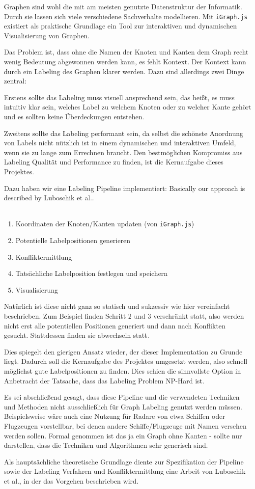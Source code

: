 Graphen sind wohl die mit am meisten genutzte Datenstruktur der Informatik.
Durch sie lassen sich viele verschiedene Sachverhalte modellieren.
Mit \texttt{iGraph.js} existiert als praktische Grundlage ein Tool zur interaktiven und dynamischen Visualisierung von Graphen.

Das Problem ist, dass ohne die Namen der Knoten und Kanten dem Graph recht wenig Bedeutung abgewonnen werden kann,
es fehlt Kontext. Der Kontext kann durch ein Labeling des Graphen klarer werden. Dazu sind allerdings zwei Dinge zentral:

Erstens sollte das Labeling muss visuell ansprechend sein, das heißt, es muss intuitiv klar sein, welches Label zu welchem Knoten oder zu welcher Kante gehört
und es sollten keine Überdeckungen entstehen.

Zweitens sollte das Labeling performant sein, da selbst die schönste Anordnung von Labels nicht nützlich ist in einem dynamischen und interaktiven Umfeld, wenn sie zu lange zum Errechnen braucht.
Den bestmöglichen Kompromiss aus Labeling Qualität und Performance zu finden, ist die Kernaufgabe dieses Projektes.

Dazu haben wir eine Labeling Pipeline implementiert:
Basically our approach is described by Luboschik et al.. \\ \\
\begin{enumerate}
    \item Koordinaten der Knoten/Kanten updaten (von \texttt{iGraph.js})
    \item Potentielle Labelpositionen generieren
    \item Konfliktermittlung
    \item Tatsächliche Labelposition festlegen und speichern
    \item Visualisierung
\end{enumerate}

Natürlich ist diese nicht ganz so statisch und sukzessiv wie hier vereinfacht beschrieben.
Zum Beispiel finden Schritt 2 und 3 verschränkt statt, also werden nicht erst alle potentiellen Positionen generiert und dann nach Konflikten gesucht.
Stattdessen finden sie abwechseln statt.

Dies spiegelt den gierigen Ansatz wieder, der dieser Implementation zu Grunde liegt. Dadurch soll die Kernaufgabe des Projektes umgesetzt werden,
also schnell möglichst gute Labelpositionen zu finden. Dies schien die sinnvollste Option in Anbetracht der Tatsache, dass das Labeling Problem NP-Hard ist.

Es sei abschließend gesagt, dass diese Pipeline und die verwendeten Techniken und Methoden nicht ausschließlich für Graph Labeling genutzt werden müssen.
Beispielsweise wäre auch eine Nutzung für Radare von etwa Schiffen oder Flugzeugen vorstellbar, bei denen andere Schiffe/Flugzeuge mit Namen versehen werden sollen.
Formal genommen ist das ja ein Graph ohne Kanten - sollte nur darstellen, dass die Techniken und Algorithmen sehr generisch sind.

Als hauptsächliche theoretische Grundlage diente zur Spezifikation der Pipeline sowie der Labeling Verfahren und Konfliktermittlung eine Arbeit von Luboschik et al.\cite{RN38}, in der das Vorgehen beschrieben wird.